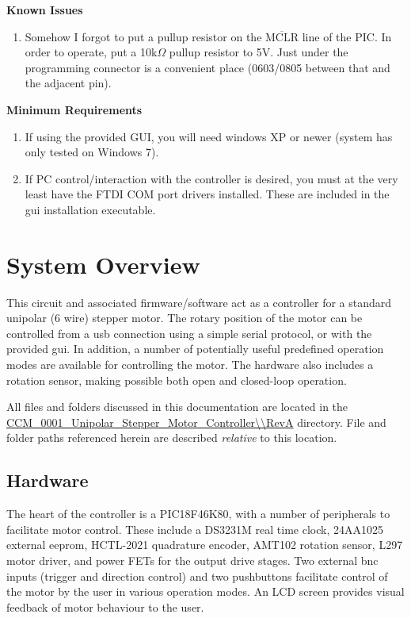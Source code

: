 \documentclass[10pt]{article}
\begin{document}


\newpage
\tableofcontents

\newpage
{\large{\bf Known Issues}}
\begin{enumerate}
\item{Somehow I forgot to put a pullup resistor on the $\overline{\text{MCLR}}$ line of the PIC.  In order to operate, put a 10k$\Omega$ pullup resistor to 5V.  Just under the programming connector is a convenient place (0603/0805 between that and the adjacent pin).}
\end{enumerate}

\vspace{0.5in}

{\large{\bf Minimum Requirements}}
\begin{enumerate}
\item{If using the provided GUI, you will need windows XP or newer (system has only tested on Windows 7).}
\item{If PC control/interaction with the controller is desired, you must at the very least have the FTDI COM port drivers installed.  These are included in the gui installation executable.}
\end{enumerate}

\FloatBarrier
\newpage
\section{System Overview}
This circuit and associated firmware/software act as a controller for a standard unipolar (6 wire) stepper motor.  The rotary position of the motor can be controlled from a usb connection using a simple serial protocol, or with the provided gui.  In addition, a number of potentially useful predefined operation modes are available for controlling the motor.  The hardware also includes a rotation sensor, making possible both open and closed-loop operation.

All files and folders discussed in this documentation are located in the \url{CCM_0001_Unipolar_Stepper_Motor_Controller\\RevA} directory.  File and folder paths referenced herein are described \emph{relative} to this location.

\subsection{Hardware}
\label{Hardware}   
The heart of the controller is a PIC18F46K80, with a number of peripherals to facilitate motor control.  These include a DS3231M real time clock, 24AA1025 external eeprom, HCTL-2021 quadrature encoder, AMT102 rotation sensor, L297 motor driver, and power FETs for the output drive stages.  Two external bnc inputs (trigger and direction control) and two pushbuttons facilitate control of the motor by the user in various operation modes.  An LCD screen provides visual feedback of motor behaviour to the user. 
\end{document}
